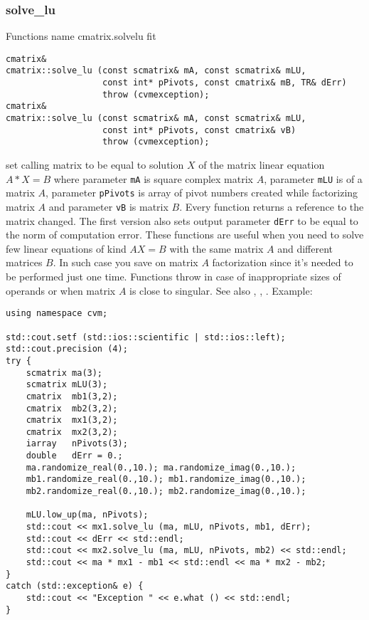 \subsubsection{solve\_lu}
Functions%
\pdfdest name {cmatrix.solvelu} fit
\begin{verbatim}
cmatrix&
cmatrix::solve_lu (const scmatrix& mA, const scmatrix& mLU,
                   const int* pPivots, const cmatrix& mB, TR& dErr)
                   throw (cvmexception);
cmatrix&
cmatrix::solve_lu (const scmatrix& mA, const scmatrix& mLU,
                   const int* pPivots, const cmatrix& vB)
                   throw (cvmexception);
\end{verbatim}
set  calling matrix to be equal to solution $X$ of the
matrix linear equation
$A*X=B$ where  parameter \verb"mA" is  square complex matrix $A$,
parameter \verb"mLU" is 
of a matrix $A$, parameter \verb"pPivots" is  array of pivot numbers
created while factorizing  matrix $A$
and  parameter \verb"vB" is  matrix $B$.
Every function returns a reference to the matrix changed.
The first version also sets output parameter \verb"dErr" to be equal
to the norm of computation error.
These functions are useful when you need to solve few linear equations
of kind $AX=B$ with the same matrix $A$ and different matrices $B$.
In such case you save on matrix $A$ factorization since it's needed to be
performed just one time.
Functions throw 
in case of inappropriate sizes
of operands or when  matrix $A$ is close to singular.
See also
,
,
.
Example:
\begin{Verbatim}
using namespace cvm;

std::cout.setf (std::ios::scientific | std::ios::left); 
std::cout.precision (4);
try {
    scmatrix ma(3);
    scmatrix mLU(3);
    cmatrix  mb1(3,2);
    cmatrix  mb2(3,2);
    cmatrix  mx1(3,2);
    cmatrix  mx2(3,2);
    iarray   nPivots(3);
    double   dErr = 0.;
    ma.randomize_real(0.,10.); ma.randomize_imag(0.,10.);
    mb1.randomize_real(0.,10.); mb1.randomize_imag(0.,10.);
    mb2.randomize_real(0.,10.); mb2.randomize_imag(0.,10.);

    mLU.low_up(ma, nPivots);
    std::cout << mx1.solve_lu (ma, mLU, nPivots, mb1, dErr);
    std::cout << dErr << std::endl;
    std::cout << mx2.solve_lu (ma, mLU, nPivots, mb2) << std::endl;
    std::cout << ma * mx1 - mb1 << std::endl << ma * mx2 - mb2;
}
catch (std::exception& e) {
    std::cout << "Exception " << e.what () << std::endl;
}
\end{Verbatim}
